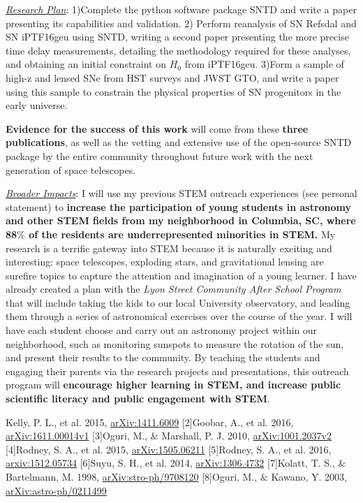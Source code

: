 \noindent\underline{\textit{Research Plan}}:
1)Complete the python software package SNTD and write a paper
presenting its capabilities and validation. 2) Perform reanalysis of
SN Refsdal and SN iPTF16geu using SNTD, writing a second paper
presenting the more precise time delay measurements, detailing the
methodology required for these analyses, and obtaining an initial
constraint on $H_0$ from iPTF16geu. 3)Form a sample of high-z and
lensed SNe from HST surveys and JWST GTO, and write a paper using this
sample to constrain the physical properties of SN progenitors in the
early universe.

\textbf{Evidence for the success of this work} will come from these \textbf{three publications}, as well as the vetting and
extensive use of the open-source SNTD package by the entire community
throughout future work with the next generation of space telescopes.


\noindent\underline{\textit{Broader Impacts}}:
I will use my previous STEM outreach experiences (see personal
statement) to \textbf{increase the participation of young students in
astronomy and other STEM fields from my neighborhood in Columbia, SC,
where 88$\%$ of the residents are underrepresented minorities in
STEM.}  My research is a terrific gateway into STEM because it is
naturally exciting and interesting: space telescopes, exploding stars,
and gravitational lensing are surefire topics to capture the attention
and imagination of a young learner. I have already created a plan with
the \textit{Lyon Street Community After School Program} that
will include taking the kids to our local University observatory, and
leading them through a series of astronomical
exercises over the course of the year. I will have each student choose
and carry out an astronomy project within our neighborhood, such as
monitoring sunspots to measure the rotation of the sun, and present
their results to the community. By teaching the students and engaging
their parents via the research projects and presentations, this outreach
program will \textbf{ encourage higher learning in STEM, and increase
public scientific literacy and public engagement with STEM}.

\noindent\fontsize{10}{14}\selectfont
[1]Kelly, P. L., et al. 2015, \href{http://arXiv.org/abs/1411.6009}{arXiv:1411.6009} [2]Goobar, A., et
al. 2016, \href{http://arXiv.org/abs/1611.00014v1}{arXiv:1611.00014v1} [3]Oguri, M., $\&$ Marshall, P. J. 2010, \href{http://arXiv.org/abs/arXiv:1001.2037v2}{arXiv:1001.2037v2} [4]Rodney, S. A., et al. 2015, \href{http://arXiv.org/abs/1505.06211}{arXiv:1505.06211}
[5]Rodney, S. A., et al. 2016, \href{http://arxiv.org/abs/1512.05734}{arxiv:1512.05734} [6]Suyu, S. H., et
al. 2014, \href{http://arXiv.org/abs/1306.4732}{arXiv:1306.4732} [7]Kolatt, T. S., $\&$ Bartelmann, M. 1998, \href{http://arXiv.org/abs/astro-ph/9708120}{arXiv:stro-ph/9708120} [8]Oguri, M., $\&$ Kawano, Y. 2003, \href{http://arXiv.org/abs/astro-ph/0211499}{arXiv:astro-ph/0211499}
\pagebreak







